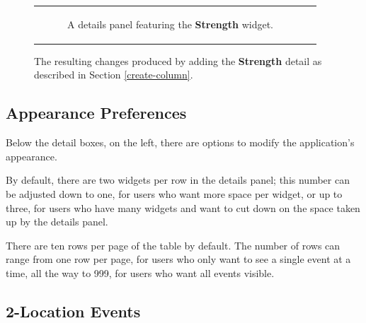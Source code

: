 \documentclass[letterpaper]{article}
\begin{document}
\begin{figure}[t]
\begin{tabular}[b]{cc}
\begin{subfigure}{.3\textwidth}
			\caption{A details panel featuring the \textbf{Strength} widget.}
		\end{subfigure}
	\end{tabular}
	\caption{The resulting changes produced by adding the \textbf{Strength} detail as described in Section \ref{create-column}.}
		\label{fig:strength-changes}
\end{figure}

\subsection{Appearance Preferences} \label{modify-appearance}
Below the detail boxes, on the left, there are options to modify the application's appearance.

By default, there are two widgets per row in the details panel; this number can be adjusted down to one, for users who want more space per widget, or up to three, for users who have many widgets and want to cut down on the space taken up by the details panel.

There are ten rows per page of the table by default. The number of rows can range from one row per page, for users who only want to see a single event at a time, all the way to 999, for users who want all events visible.
\subsection{2-Location Events} \label{two-location}
\end{document}
